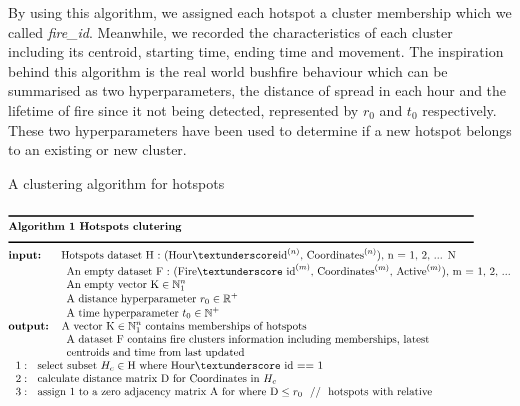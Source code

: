 \documentclass{monashthesis}
\begin{document}
By using this algorithm, we assigned each hotspot a cluster membership
which we called \emph{fire\_id}. Meanwhile, we recorded the
characteristics of each cluster including its centroid, starting time,
ending time and movement. The inspiration behind this algorithm is the
real world bushfire behaviour which can be summarised as two
hyperparameters, the distance of spread in each hour and the lifetime of
fire since it not being detected, represented by \(r_0\) and \(t_0\)
respectively. These two hyperparameters have been used to determine if a
new hotspot belongs to an existing or new cluster.

\newpage

\normalfont

\begin{table}
\caption{\label{tab:clustering}A clustering algorithm for hotspots}
\begin{align*}
&\rule{150mm}{0.5mm}\\[-1\jot]
&\textbf{Algorithm 1 Hotspots clutering}\\[-1\jot]
&\rule{150mm}{0.5mm}\\[-1\jot]
&\textbf{input: }~~~~\text{Hotspots dataset H : (Hour}\textunderscore \text{id}^{(n)} \text{, Coordinates}^{(n)} \text{), n = 1, 2, ... N}\\[-1\jot]
&~~~~~~~~~~~~~~~~\text{An empty dataset F : (Fire\textunderscore id}^{(m)} \text{, Coordinates}^{(m)} \text{, Active}^{(m)} \text{), m = 1, 2, ...}\\[-1\jot]
&~~~~~~~~~~~~~~~~\text{An empty vector K} \in \mathbb{N}_1^n\\[-1\jot]
&~~~~~~~~~~~~~~~~\text{A distance hyperparameter }r_0 \in \mathbb{R}^+\\[-1\jot]
&~~~~~~~~~~~~~~~~\text{A time hyperparameter }t_0 \in \mathbb{N}^+\\[-1\jot]
&\textbf{output: }~~\text{A vector K} \in \mathbb{N}_1^n~\text{contains memberships of hotspots}\\[-1\jot]
&~~~~~~~~~~~~~~~~\text{A dataset F contains fire clusters information including memberships, latest}\\[-1\jot]
&~~~~~~~~~~~~~~~~\text{centroids and time from last updated}\\[-1\jot]
&~~1:~~\text{select subset }H_c \in \text{H where Hour\textunderscore id == 1}\\[-1\jot]
&~~2:~~\text{calculate distance matrix D for Coordinates in }H_c \\[-1\jot]
&~~3:~~\text{assign 1 to a zero adjacency matrix A for where D} \leq r_0~~//~~\text{hotspots with relative}\\[-1\jot]

\end{align*}
\end{table}
\end{document}
